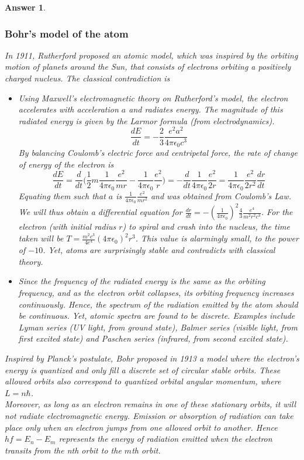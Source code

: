 \documentclass[a4paper]{article}
\newtheorem{ans}{Answer}[subsection]
\theoremstyle{new}
\begin{document}
\begin{ans}\leavevmode
\subsubsection*{Bohr's model of the atom}
In 1911, Rutherford proposed an atomic model, which was inspired by the orbiting motion of planets around the Sun, that consists of electrons orbiting a positively charged nucleus. The classical contradiction is
\begin{itemize}
\item Using Maxwell's electromagnetic theory on Rutherford's model, the electron accelerates with acceleration $a$ and radiates energy. The magnitude of this radiated energy is given by the Larmor formula (from electrodynamics).
$$\frac{dE}{dt}=-\frac{2}{3}\frac{e^2a^2}{4\pi\epsilon_0c^3}$$
By balancing Coulomb's electric force and centripetal force, the rate of change of energy of the electron is 
$$\frac{dE}{dt}=\frac{d}{dt}\bigg(\frac{1}{2}m\frac{1}{4\pi\epsilon_0}\frac{e^2}{mr}-\frac{1}{4\pi\epsilon_0}\frac{e^2}{r}\bigg)=-\frac{d}{dt}\frac{1}{4\pi\epsilon_0}\frac{e^2}{2r}=\frac{1}{4\pi\epsilon_0}\frac{e^2}{2r^2}\frac{dr}{dt}$$
Equating them such that $a$ is $\frac{1}{4\pi\epsilon_0}\frac{e^2}{mr^2}$ and was obtained from Coulomb's Law. We will thus obtain a differential equation for $\frac{dr}{dt}=-(\frac{1}{4\pi\epsilon_0})^2\frac{4}{3}\frac{e^4}{m^2r^2c^3}$. For the electron (with initial radius $r$) to spiral and crash into the nucleus, the time taken will be
$T=\frac{m^2c^3}{4e^4}(4\pi\epsilon_0)^2r^3$. 
This value is alarmingly small, to the power of $-10$. Yet, atoms are surprisingly stable and contradicts with classical theory.
\item Since the frequency of the radiated energy is the same as the orbiting frequency, and as the electron orbit collapses, its orbiting frequency increases continuously. Hence, the spectrum of the radiation emitted by the atom should be continuous. Yet, atomic spectra are found to be discrete. Examples include Lyman series (UV light, from ground state), Balmer series (visible light, from first excited state) and Paschen series (infrared, from second excited state).
\end{itemize}
Inspired by Planck's postulate, Bohr proposed in 1913 a model where the electron's energy is quantized and only fill a discrete set of circular stable orbits. These allowed orbits also correspond to quantized orbital angular momentum, where $L=n\hbar$.\\[5pt]
Moreover, as long as an electron remains in one of these stationary orbits, it will not radiate electromagnetic energy. Emission or absorption of radiation can take place only when an electron jumps from one allowed orbit to another. Hence $hf=E_n-E_m$ represents the energy of radiation emitted when the electron transits from the nth orbit to the $m$th orbit.\\[5pt]

\end{ans}
\end{document}
